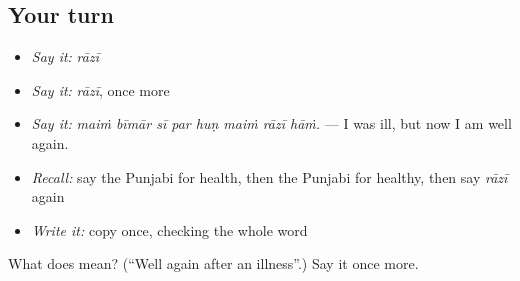 \subsection*{Your turn}
\begin{itemize}
\raggedright
  \item \emph{Say it:} \emph{rāzī}
  \item \emph{Say it:} \emph{rāzī}, once more
  \item \emph{Say it:} \emph{maiṁ bīmār sī par huṇ maiṁ rāzī hāṁ.} — I was ill, but now I am well again.
  \item \emph{Recall:} say the Punjabi for health, then the Punjabi for healthy, then say \emph{rāzī} again
  \item \emph{Write it:} copy \textbf{} once, checking the whole word
\end{itemize}

\begin{tcolorbox}[breakable,colback=teal!4,colframe=teal!35!black,title={Before you move on}]
What does  mean? (\textquotedblleft{}Well again after an illness\textquotedblright{}.) Say it once more.
\end{tcolorbox}
